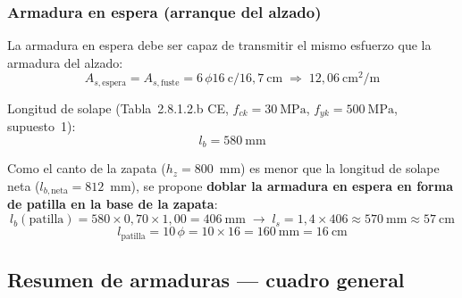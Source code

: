 \subsubsection{Armadura en espera (arranque del alzado)}
\label{subsubsec:armado_espera}

La armadura en espera debe ser capaz de transmitir el mismo esfuerzo
que la armadura del alzado:
\[
  A_{s,\mathrm{espera}} = A_{s,\mathrm{fuste}}
  = 6\,\phi 16~\text{c}/16{,}7~\text{cm}
  \;\Rightarrow\; 12{,}06~\text{cm}^2/\text{m}
\]

Longitud de solape (Tabla~2.8.1.2.b CE, $f_{ck}=30~\text{MPa}$,
$f_{yk}=500~\text{MPa}$, supuesto~1):
\[
  l_b = 580~\text{mm}
\]

Como el canto de la zapata ($h_z = 800$~mm) es menor que la longitud de
solape neta ($l_{b,\text{neta}} = 812$~mm), se propone \textbf{doblar la
armadura en espera en forma de patilla en la base de la zapata}:
\[
  l_b(\text{patilla}) = 580 \times 0{,}70 \times 1{,}00 = 406~\text{mm}
  \;\longrightarrow\; l_s = 1{,}4\times 406 \approx 570~\text{mm} \approx 57~\text{cm}
\]
\[
  l_{\mathrm{patilla}} = 10\,\phi = 10\times 16 = 160~\text{mm} = 16~\text{cm}
\]

\subsection{Resumen de armaduras — cuadro general}
\label{subsec:resumen_armaduras}


